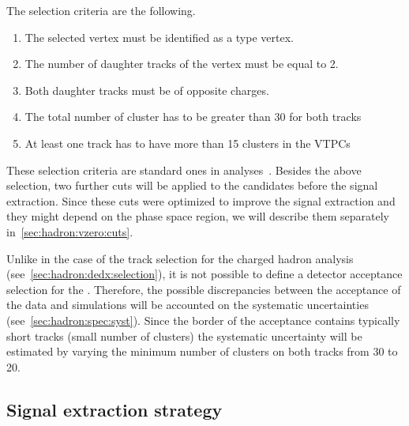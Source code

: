 The \vzero selection criteria are the following.
\begin{enumerate}[label=(\roman*)]
\item The selected vertex must be identified as a \vzero type vertex.
\item The number of daughter tracks of the vertex must be equal to 2.
\item Both daughter tracks must be of opposite charges.
\item The total number of cluster has to be greater than 30 for both tracks
\item At least one track has to have more than 15 clusters in the VTPCs
\end{enumerate}
These selection criteria are standard ones
in \NASixtyOne analyses~\cite{Aduszkiewicz:2015dmr,Abgrall:2015hmv}.
Besides the above selection, two further \vzero cuts will be applied
to the \vzero candidates before the signal extraction. Since
these cuts were optimized to improve the signal extraction and they might
depend on the phase space region, we will describe them separately
in~\cref{sec:hadron:vzero:cuts}.

Unlike in the case of the track selection for the charged hadron
analysis (see~\cref{sec:hadron:dedx:selection}),
it is not possible to define a detector acceptance selection for
the \vzeros. Therefore, the possible discrepancies between
the acceptance of the data and simulations
will be accounted on the systematic uncertainties (see~\cref{sec:hadron:spec:syst}).
Since the border of the acceptance contains typically short tracks
(small number of clusters)
the systematic uncertainty will be estimated by varying the minimum number
of clusters on both tracks from 30 to 20. 

\subsection{Signal extraction strategy}
\label{sec:hadron:vzero:signal}

